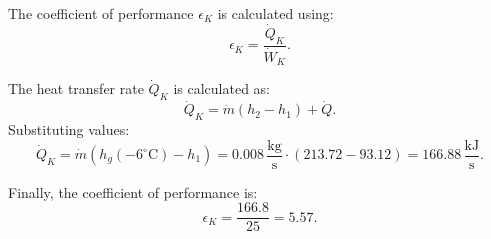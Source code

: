 The coefficient of performance \( \epsilon_K \) is calculated using:
\[
\epsilon_K = \frac{\dot{Q}_K}{\dot{W}_K}.
\]

The heat transfer rate \( \dot{Q}_K \) is calculated as:
\[
\dot{Q}_K = \dot{m}(h_2 - h_1) + \dot{Q}.
\]
Substituting values:
\[
\dot{Q}_K = \dot{m}(h_g(-6^\circ\text{C}) - h_1) = 0.008 \, \frac{\text{kg}}{\text{s}} \cdot (213.72 - 93.12) = 166.88 \, \frac{\text{kJ}}{\text{s}}.
\]

Finally, the coefficient of performance is:
\[
\epsilon_K = \frac{166.8}{25} = 5.57.
\]